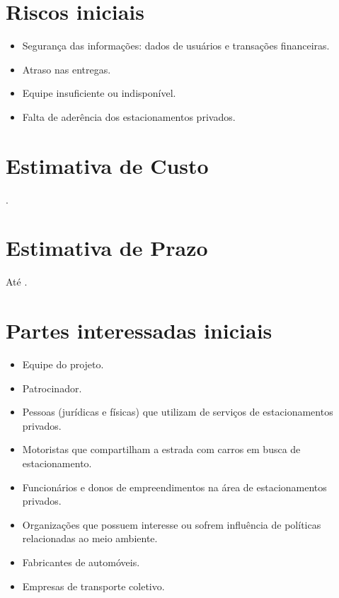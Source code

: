 \section{Riscos iniciais}

\begin{itemize}
	\item Segurança das informações: dados de usuários e transações financeiras.
	\item Atraso nas entregas.
	\item Equipe insuficiente ou indisponível.
	\item Falta de aderência dos estacionamentos privados. %
\end{itemize}

\section{Estimativa de Custo}

\maximumBudget.

\section{Estimativa de Prazo}

Até \maximumDeadline.

\section{Partes interessadas iniciais}

\begin{itemize}
	\item Equipe do projeto.
	\item Patrocinador.
	\item Pessoas (jurídicas e físicas) que utilizam de serviços de estacionamentos privados.
	\item Motoristas que compartilham a estrada com carros em busca de estacionamento.
	\item Funcionários e donos de empreendimentos na área de estacionamentos privados.
	\item Organizações que possuem interesse ou sofrem influência de políticas relacionadas ao meio ambiente.
	\item Fabricantes de automóveis.
	\item Empresas de transporte coletivo.
\end{itemize}


